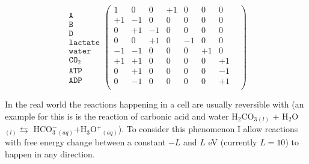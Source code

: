 \documentclass[10pt,a4paper]{article}
\begin{document}
	\begin{equation}
	\begin{matrix}
		\texttt{A}   \\
		\texttt{B}\\
		\texttt{D}\\
		\texttt{lactate}\\
		\texttt{water}\\
		\texttt{CO}_2\\
		\texttt{ATP}\\
		\texttt{ADP}
	\end{matrix}
	\begin{pmatrix}
			  1 &  0 &  0 & +1 &  0 &  0 & 0 &  \\ 
			  +1 & -1 &  0 &  0 &  0 &  0 & 0 &  \\ 
			  0 & +1 & -1 &  0 &  0 &  0 & 0 &  \\ 
			  0  &  0 & +1 &  0 & -1 &  0 & 0 &  \\ 
			  -1 & -1 &  0 &  0 &  0 &+1  & 0 &  \\ 
			  +1 & +1 &  0 &  0 &  0 &  0 & +1&  \\ 
			  0 & +1 &  0 &  0 &  0 & 0 & -1 &\\ 
			  0 & -1 &  0 &  0 &  0 & 0 & +1 & \\ 
			  
		\end{pmatrix} 
	\end{equation}



	In the real world the reactions happening in a cell are usually reversible with (an example for this is is the reaction of carbonic acid and water H$_2$CO$_3$$_{(l)}$ + H$_2$O$_{(l)} \leftrightarrows$ HCO$^-_3$$_{(aq)}$+H$_3$O$^+$$_{(aq)}$). To consider this phenomenon I allow reactions with free energy change between a constant $-L$ and $L$ eV (currently $L=10$) to happen in any direction. 
	
\end{document}

